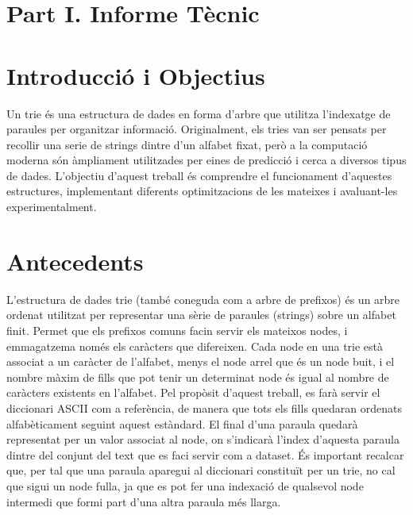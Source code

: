 \section*{\centering Part I. Informe Tècnic}

\section{Introducció i Objectius}

Un trie és una estructura de dades en forma d'arbre que utilitza l'indexatge de paraules per organitzar informació. Originalment, els tries van ser pensats per recollir una serie de strings dintre d'un alfabet fixat, però a la computació moderna són àmpliament utilitzades per eines de predicció i cerca a diversos tipus de dades. L'objectiu d'aquest treball és comprendre el funcionament d'aquestes estructures, implementant diferents optimitzacions de les mateixes i avaluant-les experimentalment. 

\section{Antecedents}

L'estructura de dades trie (també coneguda com a arbre de prefixos) és un arbre ordenat utilitzat per representar una sèrie de paraules (strings) sobre un alfabet finit. Permet que els prefixos comuns facin servir els mateixos nodes, i emmagatzema només els caràcters que difereixen. 
Cada node en una trie està associat a un caràcter de l'alfabet, menys el node arrel que és un node buit, i el nombre màxim de fills que pot tenir un determinat node és igual al nombre de caràcters existents en l'alfabet. Pel propòsit d'aquest treball, es farà servir el diccionari ASCII com a referència, de manera que tots els fills quedaran ordenats alfabèticament seguint aquest estàndard. El final d'una paraula quedarà representat per un valor associat al node, on s'indicarà l'index d'aquesta paraula dintre del conjunt del text que es faci servir com a dataset. És important recalcar que, per tal que una paraula aparegui al diccionari constituït per un trie, no cal que sigui un node fulla, ja que es pot fer una indexació de qualsevol node intermedi que formi part d'una altra paraula més llarga. 

\usetikzlibrary{arrows.meta, positioning}

